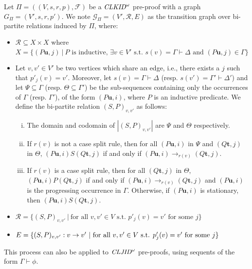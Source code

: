 \begin{definition}
\label{def:preProofTrans}

Let $\Pi = ((V, s, r, p), \mathcal{F})$ be a $\textit{CLKID}^\omega$ pre-proof with a graph $G_{\Pi} = (V',s,r,p')$. We note $\mathcal{G}_{\Pi} = (V', \mathcal{R}, E)$ as the transition graph over bi-partite relations induced by $\Pi$, where:
\begin{itemize}

     \item $\mathcal{R} \subseteq X \times X$ where $X = \{ (P\mathbf{u},j) \ | \ \text{$P$ is inductive, $\exists v \in V'$ s.t. $s(v) = \Gamma \vdash \Delta$ and $(P\mathbf{u},j) \in \Gamma$} \}$

     \item Let $v,v' \in V'$ be two vertices which share an edge, i.e., there exists a $j$ such that $p'_j(v) = v'$. Moreover, let $s(v) = \Gamma \vdash \Delta$ (resp. $s(v') = \Gamma' \vdash \Delta'$) and let $\Psi \subseteq \Gamma$ (resp. $\Theta \subseteq \Gamma'$)
     be the sub-sequences containing only the occurrences of $\Gamma$ (resp. $\Gamma'$), of the form $(P\mathbf{u}, i)$, where $P$ is an inductive predicate. We define the bi-partite relation $(S,P)_{v,v'}$ as follows:
        \begin{enumerate}[i)]
            \item The domain and codomain of $|(S,P)_{v,v'}|$ are $\Psi$ and $\Theta$ respectively.
            

            \item If $r(v)$ is not a case split rule, then for all $(P\mathbf{u},i)$ in $\Psi$ and $(Q\mathbf{t},j)$ in $\Theta$, $(P\mathbf{u},i) S (Q\mathbf{t},j)$ if and only if $(P\mathbf{u},i) \rightarrow_{r(v)} (Q\mathbf{t},j)$.

            \item If $r(v)$ is a case split rule, then for all $(Q\mathbf{t},j)$ in $\Theta$, $(P\mathbf{u},i) P (Q\mathbf{t},j)$ if and only if $(P\mathbf{u},i) \rightarrow_{r(v)} (Q\mathbf{t},j)$ and $(P\mathbf{u},i)$ is the progressing 
            occurrence in $\Gamma$. Otherwise, if $(P\mathbf{u},i)$ is stationary, then $(P\mathbf{u},i) S (Q\mathbf{t},j)$.

        \end{enumerate}

    \item $\mathcal{R} = \{(S,P)_{v,v'} \ | \ \text{for all $v,v' \in V$ s.t. $p'_j(v) = v'$ for some $j$}  \}$

    \item $E = \{\edge{(S,P)_{v,v'}}{v}{v'} \ | \ \text{for all $v,v' \in V$ s.t. $p'_j(v) = v'$ for some $j$}  \}$
 \end{itemize} 

This process can also be applied to $\textit{CLJID}^\omega$ pre-proofs, using sequents of the form $\Gamma \vdash \phi$.

\end{definition}

